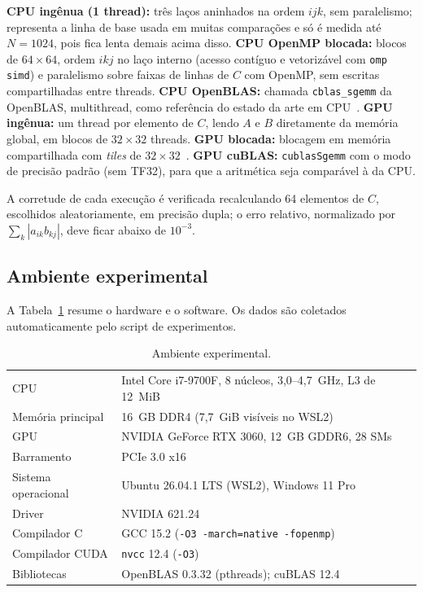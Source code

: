 \documentclass[12pt]{article}
\newcommand{\nSeq}{1024}
\begin{document}
\textbf{CPU ingênua (1 thread):} três laços aninhados na ordem $ijk$, sem
paralelismo; representa a linha de base usada em muitas comparações e só é
medida até $N=\nSeq$, pois fica lenta demais acima disso.
\textbf{CPU OpenMP blocada:} blocos de $64\times64$, ordem $ikj$ no laço
interno (acesso contíguo e vetorizável com \texttt{omp simd}) e paralelismo
sobre faixas de linhas de $C$ com OpenMP, sem escritas compartilhadas entre
threads.
\textbf{CPU OpenBLAS:} chamada \texttt{cblas\_sgemm} da OpenBLAS, multithread,
como referência do estado da arte em CPU~\cite{goto2008}.
\textbf{GPU ingênua:} um thread por elemento de $C$, lendo $A$ e $B$
diretamente da memória global, em blocos de $32\times32$ threads.
\textbf{GPU blocada:} blocagem em memória compartilhada com
\emph{tiles} de $32\times32$~\cite{hwu2022}.
\textbf{GPU cuBLAS:} \texttt{cublasSgemm} com o modo de precisão padrão
(sem TF32), para que a aritmética seja comparável à da CPU.

A corretude de cada execução é verificada recalculando 64 elementos de $C$,
escolhidos aleatoriamente, em precisão dupla; o erro relativo, normalizado por
$\sum_k|a_{ik}b_{kj}|$, deve ficar abaixo de $10^{-3}$.

\subsection{Ambiente experimental}

A Tabela~\ref{tab:ambiente} resume o hardware e o software. Os dados são
coletados automaticamente pelo script de experimentos.

\begin{table}[ht]
\centering
\caption{Ambiente experimental.}
\label{tab:ambiente}
\small
\begin{tabular}{ll}
\hline
CPU & Intel Core i7-9700F, 8 núcleos, 3,0--4,7~GHz, L3 de 12~MiB \\
Memória principal & 16~GB DDR4 (7,7~GiB visíveis no WSL2) \\
GPU & NVIDIA GeForce RTX 3060, 12~GB GDDR6, 28 SMs \\
Barramento & PCIe 3.0 x16 \\
Sistema operacional & Ubuntu 26.04.1 LTS (WSL2), Windows 11 Pro \\
Driver & NVIDIA 621.24 \\
Compilador C & GCC 15.2 (\texttt{-O3 -march=native -fopenmp}) \\
Compilador CUDA & \texttt{nvcc} 12.4 (\texttt{-O3}) \\
Bibliotecas & OpenBLAS 0.3.32 (pthreads); cuBLAS 12.4 \\
\hline
\end{tabular}
\end{table}
\end{document}

